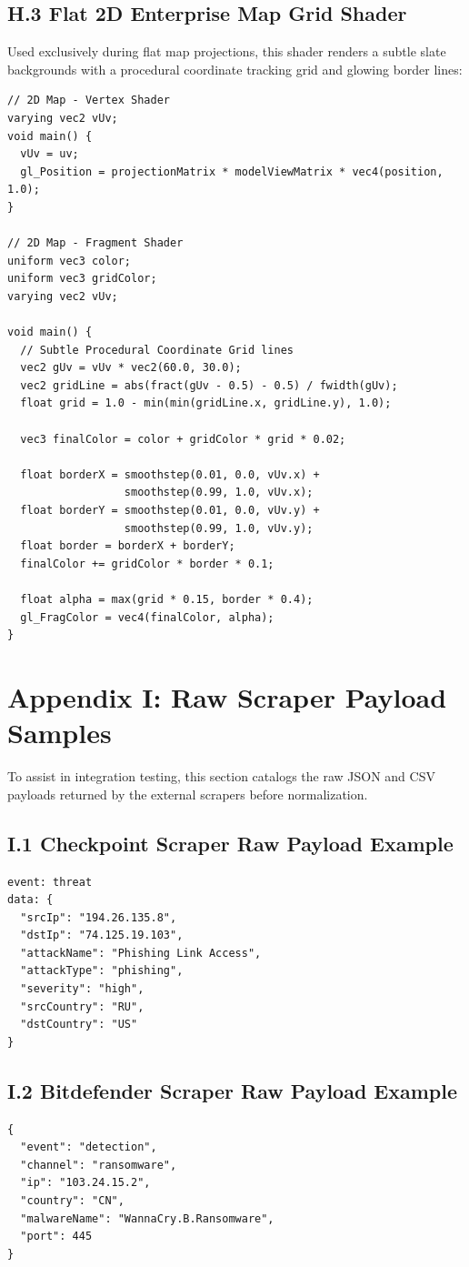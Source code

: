 \subsection*{H.3 Flat 2D Enterprise Map Grid Shader}
Used exclusively during flat map projections, this shader renders a subtle slate backgrounds with a procedural coordinate tracking grid and glowing border lines:
\begin{verbatim}
// 2D Map - Vertex Shader
varying vec2 vUv;
void main() {
  vUv = uv;
  gl_Position = projectionMatrix * modelViewMatrix * vec4(position, 1.0);
}

// 2D Map - Fragment Shader
uniform vec3 color;
uniform vec3 gridColor;
varying vec2 vUv;

void main() {
  // Subtle Procedural Coordinate Grid lines
  vec2 gUv = vUv * vec2(60.0, 30.0);
  vec2 gridLine = abs(fract(gUv - 0.5) - 0.5) / fwidth(gUv);
  float grid = 1.0 - min(min(gridLine.x, gridLine.y), 1.0);
  
  vec3 finalColor = color + gridColor * grid * 0.02; 
  
  float borderX = smoothstep(0.01, 0.0, vUv.x) + 
                  smoothstep(0.99, 1.0, vUv.x);
  float borderY = smoothstep(0.01, 0.0, vUv.y) + 
                  smoothstep(0.99, 1.0, vUv.y);
  float border = borderX + borderY;
  finalColor += gridColor * border * 0.1;

  float alpha = max(grid * 0.15, border * 0.4);
  gl_FragColor = vec4(finalColor, alpha);
}
\end{verbatim}

\section*{Appendix I: Raw Scraper Payload Samples}
To assist in integration testing, this section catalogs the raw JSON and CSV payloads returned by the external scrapers before normalization.

\subsection*{I.1 Checkpoint Scraper Raw Payload Example}
\begin{verbatim}
event: threat
data: {
  "srcIp": "194.26.135.8",
  "dstIp": "74.125.19.103",
  "attackName": "Phishing Link Access",
  "attackType": "phishing",
  "severity": "high",
  "srcCountry": "RU",
  "dstCountry": "US"
}
\end{verbatim}

\subsection*{I.2 Bitdefender Scraper Raw Payload Example}
\begin{verbatim}
{
  "event": "detection",
  "channel": "ransomware",
  "ip": "103.24.15.2",
  "country": "CN",
  "malwareName": "WannaCry.B.Ransomware",
  "port": 445
}
\end{verbatim}

